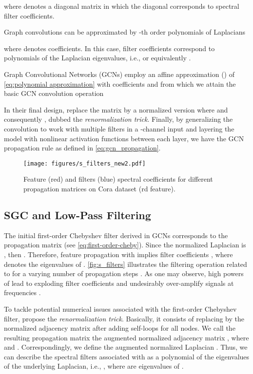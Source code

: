 \documentclass{article}
\newcommand{\method}{SGC}
\begin{document}
where  denotes a diagonal matrix in which the diagonal corresponds to spectral filter coefficients. 

Graph convolutions can be approximated by -th order polynomials of Laplacians

where  denotes coefficients. In this case, filter coefficients correspond to polynomials of the Laplacian eigenvalues, i.e.,  or equivalently . 


Graph Convolutional Networks (GCNs) \cite{gcn} employ an affine approximation () of \autoref{eq:polynomial approximation} with coefficients  and  from which we attain the basic GCN convolution operation


In their final design, \citet{gcn} replace the matrix  by a normalized version  where  and consequently , dubbed the \textit{renormalization trick}. Finally, by generalizing the convolution to work with multiple filters in a -channel input and layering the model with nonlinear activation functions between each layer, we have the GCN propagation rule as defined in \autoref{eq:gcn_propagation}.

\begin{figure*}[tb] 
\centering
\texttt{[image: figures/s\_filters\_new2.pdf]}
\caption{Feature ({\color{myred}red}) and filters ({\color{myblue}blue}) spectral coefficients for different propagation matrices on Cora dataset (rd feature).}
\label{fig:s_filters}
\end{figure*}

\subsection{\method{} and Low-Pass Filtering}
The initial first-order Chebyshev filter derived in GCNs corresponds to the propagation matrix  (see \autoref{eq:first-order-cheby}). Since the normalized Laplacian is , then . Therefore, feature propagation with  implies filter coefficients , where  denotes the eigenvalues of . \autoref{fig:s_filters} illustrates the filtering operation related to  for a varying number of propagation steps . As one may observe, high powers of  lead to exploding filter coefficients and undesirably over-amplify signals at frequencies .


To tackle potential numerical issues associated with the first-order Chebyshev filter, \citet{gcn} propose the \textit{renormalization trick}. Basically, it consists of replacing  by the normalized adjacency matrix after adding self-loops for all nodes. We call the resulting propagation matrix the augmented normalized adjacency matrix , where  and . Correspondingly, we define the augmented normalized Laplacian . Thus, we can describe the spectral filters associated with  as a polynomial of the eigenvalues of the underlying Laplacian, i.e.,  , where  are eigenvalues of .
\end{document}
